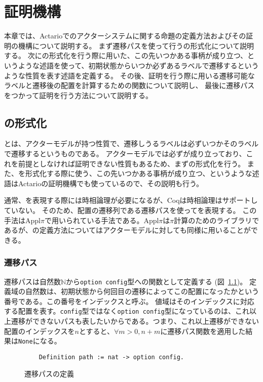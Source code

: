 \chapter{証明機構}
\label{chapter:proof}

本章では、Actarioでのアクターシステムに関する命題の定義方法およびその証明の機構について説明する。
まず遷移パスを使って行う\fairness の形式化について説明する。
次に\fairness の形式化を行う際に用いた、この先いつかある事柄が成り立つ、というような述語を使って、初期状態からいつか必ずあるラベルで遷移するというような性質を表す述語を定義する。
その後、証明を行う際に用いる遷移可能なラベルと遷移後の配置を計算するための関数について説明し、
最後に遷移パスをつかって証明を行う方法について説明する。

\section{\fairness の形式化}
\fairness とは、アクターモデルが持つ性質で、遷移しうるラベルは必ずいつかそのラベルで遷移するというものである。
アクターモデルでは必ず\fairness が成り立っており、これを前提としなければ証明できない性質もあるため、まず\fairness の形式化を行う。
また、\fairness を形式化する際に使う、この先いつかある事柄が成り立つ、というような述語はActarioの証明機構でも使っているので、その説明も行う。

通常、\fairness を表現する際には時相論理が必要になるが、Coqは時相論理はサポートしていない。
そのため、配置の遷移列である遷移パスを使って\fairness を表現する。
この手法はAppl$\pi$\cite{}で用いられている手法である。Appl$\pi$は$\pi$計算のためのライブラリであるが、\fairness の定義方法についてはアクターモデルに対しても同様に用いることができる。

\subsection{遷移パス}
遷移パスは自然数$\mathbb{N}$から\texttt{option config}型への関数として定義する (図~\ref{code:formalization:path})。
定義域の自然数は、初期状態から何回目の遷移によってこの配置になったかという番号である。この番号をインデックスと呼ぶ。
値域はそのインデックスに対応する配置を表す。\texttt{config}型ではなく\texttt{option config}型になっているのは、これ以上遷移ができないパスも表したいからである。つまり、これ以上遷移ができない配置のインデックスを$n$とすると、$\forall m > 0, n + m$に遷移パス関数を適用した結果は\texttt{None}になる。

\begin{figure}[tp]
  \begin{lstlisting}
    Definition path := nat -> option config.
  \end{lstlisting}
  \label{code:formalization:path}
  \caption{遷移パスの定義}
\end{figure}

